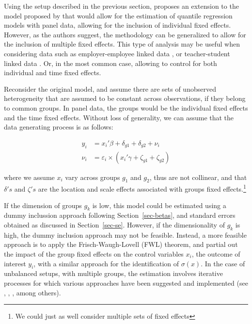 \documentclass[
  authoryear,
  review,
  1p]{elsarticle}
\begin{document}
Using the setup described in the previous section, \citet{mss2019}
proposes an extension to the model proposed by \citet{he1997} that would
allow for the estimation of quantile regression models with panel data,
allowing for the inclusion of individual fixed effects. However, as the
authors suggest, the methodology can be generalized to allow for the
inclusion of multiple fixed effects. This type of analysis may be useful
when considering data such as employer-employee linked data
\citep{abowed2006}, or teacher-student linked data
\citep{harrissass2011}. Or, in the most common case, allowing to control
for both individual and time fixed effects.

Reconsider the original model, and assume there are sets of unobserved
heterogeneity that are assumed to be constant across observations, if
they belong to common groups. In panel data, the groups would be the
individual fixed effects and the time fixed effects. Without loss of
generality, we can assume that the data generating process is as
follows:

\[\begin{aligned}
  y_{i} &= x_{i}' \beta + \delta_{g1} + \delta_{g2} + \nu_i \\
  \nu_i &= \varepsilon_i \times (x_{i}' \gamma + \zeta_{g1} + \zeta_{g2})   
  \end{aligned}
\]

where we assume \(x_{i}\) vary across groups \(g_1\) and \(g_2\), thus
are not collinear, and that \(\delta's\) and \(\zeta's\) are the
location and scale effects associated with groups fixed
effects.\footnote{We could just as well consider multiple sets of fixed
  effects}

If the dimension of groups \(g_k\) is low, this model could be estimated
using a dummy inclussion approach following Section~\ref{sec-betas}, and
standard errors obtained as discussed in Section~\ref{sec-se}. However,
if the dimensionality of \(g_k\) is high, the dummy inclusion approach
may not be feasible. Instead, a more feasible approach is to apply the
Frisch-Waugh-Lovell (FWL) theorem, and partial out the impact of the
group fixed effects on the control variables \(x_{i}\), the outcome of
interest \(y_{i}\), with a similar approach for the identification of
\(\sigma(x)\). In the case of unbalanced setups, with multiple groups,
the estimation involves iterative processes for which various approaches
have been suggested and implemented (see
\citet{correia_feasible_nodate}, \citet{gaure2013}, \citet{rios2015},
among others).
\end{document}

